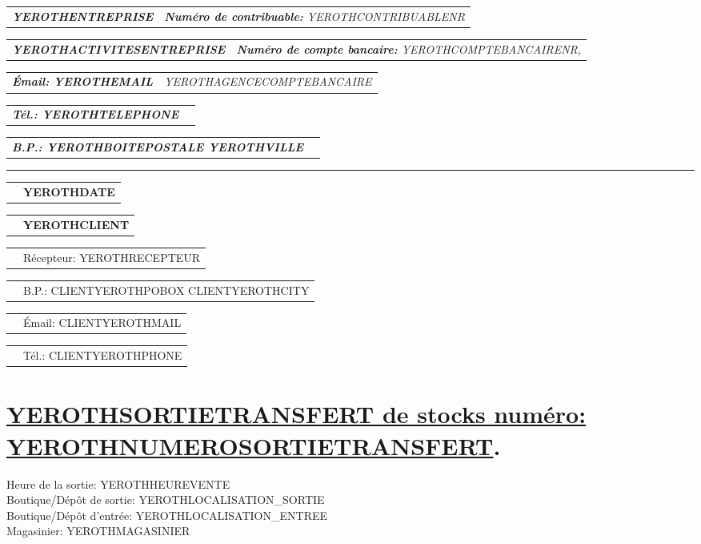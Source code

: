 \documentclass[11pt,YEROTHPAPERSPEC]{article} %
\makeatletter
\newcommand{\headerrow}[2]
{\begin{tabular*}{\linewidth}{l@{\extracolsep{\fill}}r}
	#1 &
	#2 \\
\end{tabular*}}
\newcommand{\emphbold}[1]{\textbf{\emph{#1}}\xspace}
\makeatother
\begin{document}
\bigskip

\headerrow
	{\emphbold{YEROTHENTREPRISE}}
	{\emph{\textbf{Num\'ero de contribuable:} YEROTHCONTRIBUABLENR}}
\headerrow
	{\emphbold{YEROTHACTIVITESENTREPRISE}}
	{\emph{\textbf{Num\'ero de compte bancaire:} YEROTHCOMPTEBANCAIRENR,}}
\headerrow
	{\emphbold{\'Email: YEROTHEMAIL}}
	{\emph{YEROTHAGENCECOMPTEBANCAIRE}}
\headerrow
	{\emphbold{T\'el.: YEROTHTELEPHONE}}
	{}
\headerrow
	{\emphbold{B.P.: YEROTHBOITEPOSTALE YEROTHVILLE}}
	{}
	
\hrule

\headerrow
	{}
	{\textbf{YEROTHDATE}} 

\vspace*{0.9cm}

\headerrow
{}
{\textbf{YEROTHCLIENT}}
\headerrow
{}
{R\'ecepteur: YEROTHRECEPTEUR}
\headerrow
{}
{B.P.: CLIENTYEROTHPOBOX CLIENTYEROTHCITY}
\headerrow
{}
{\'Email: CLIENTYEROTHMAIL}
\headerrow
{}
{T\'el.: CLIENTYEROTHPHONE}

\section*{\underline{YEROTHSORTIETRANSFERT de stocks num\'ero: YEROTHNUMEROSORTIETRANSFERT}.}
Heure de la sortie: YEROTHHEUREVENTE\\
Boutique/D\'ep\^ot de sortie: YEROTHLOCALISATION_SORTIE\\
Boutique/D\'ep\^ot d'entr\'ee: YEROTHLOCALISATION_ENTREE\\
Magasinier: YEROTHMAGASINIER

\vspace*{0.3cm}
\end{document}

